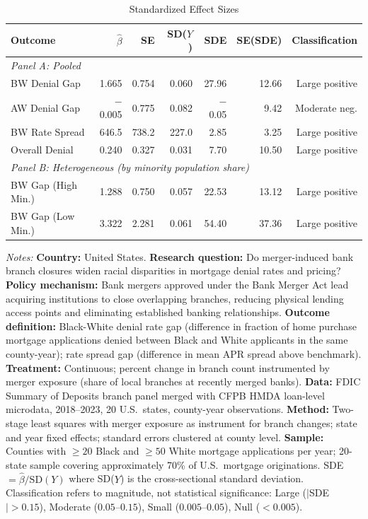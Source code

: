 \begin{table}[htbp]
\centering
\caption{Standardized Effect Sizes}
\label{tab:sde}
\small
\begin{tabular}{lrrrrrr}
\hline\hline
Outcome & $\hat{\beta}$ & SE & SD($Y$) & SDE & SE(SDE) & Classification \\
\hline
\multicolumn{7}{l}{\textit{Panel A: Pooled}} \\
BW Denial Gap & 1.665 & 0.754 & 0.060 & 27.96 & 12.66 & Large positive \\
AW Denial Gap & $-$0.005 & 0.775 & 0.082 & $-$0.05 & 9.42 & Moderate neg. \\
BW Rate Spread & 646.5 & 738.2 & 227.0 & 2.85 & 3.25 & Large positive \\
Overall Denial & 0.240 & 0.327 & 0.031 & 7.70 & 10.50 & Large positive \\
\hline
\multicolumn{7}{l}{\textit{Panel B: Heterogeneous (by minority population share)}} \\
BW Gap (High Min.) & 1.288 & 0.750 & 0.057 & 22.53 & 13.12 & Large positive \\
BW Gap (Low Min.) & 3.322 & 2.281 & 0.061 & 54.40 & 37.36 & Large positive \\
\hline\hline
\end{tabular}

\vspace{0.5em}
\begin{minipage}{\textwidth}
\footnotesize
\textit{Notes:} \textbf{Country:} United States.
\textbf{Research question:} Do merger-induced bank branch closures widen racial disparities in mortgage denial rates and pricing?
\textbf{Policy mechanism:} Bank mergers approved under the Bank Merger Act lead acquiring institutions to close overlapping branches, reducing physical lending access points and eliminating established banking relationships.
\textbf{Outcome definition:} Black-White denial rate gap (difference in fraction of home purchase mortgage applications denied between Black and White applicants in the same county-year); rate spread gap (difference in mean APR spread above benchmark).
\textbf{Treatment:} Continuous; percent change in branch count instrumented by merger exposure (share of local branches at recently merged banks).
\textbf{Data:} FDIC Summary of Deposits branch panel merged with CFPB HMDA loan-level microdata, 2018--2023, 20 U.S.\ states, county-year observations.
\textbf{Method:} Two-stage least squares with merger exposure as instrument for branch changes; state and year fixed effects; standard errors clustered at county level.
\textbf{Sample:} Counties with $\geq 20$ Black and $\geq 50$ White mortgage applications per year; 20-state sample covering approximately 70\% of U.S.\ mortgage originations.
SDE $= \hat{\beta} / \text{SD}(Y)$ where SD($Y$) is the cross-sectional standard deviation.
Classification refers to magnitude, not statistical significance: Large ($|$SDE$| > 0.15$), Moderate ($0.05$--$0.15$), Small ($0.005$--$0.05$), Null ($< 0.005$).
\end{minipage}
\end{table}
